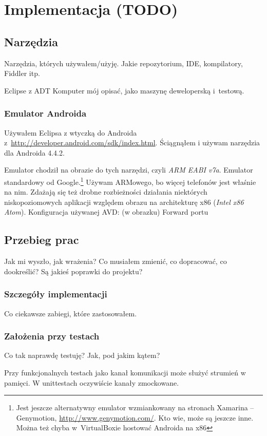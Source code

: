 \chapter{Implementacja (TODO)}

\section{Narzędzia}
Narzędzia, których używałem/użyję. Jakie repozytorium, IDE, kompilatory, Fiddler itp.

Eclipse z ADT
Komputer mój opisać, jako maszynę deweloperską i~testową.

\subsection{Emulator Androida}
\label{android-emulator}
Używałem Eclipsa z wtyczką do Androida z~\url{http://developer.android.com/sdk/index.html}.
Ściągnąłem i używam narzędzia dla Androida 4.4.2.

Emulator chodził na obrazie do tych narzędzi, czyli \emph{ARM EABI v7a}. Emulator standardowy od Google.\footnote{Jest jeszcze alternatywny emulator wzmiankowany na stronach Xamarina -- Genymotion, \url{http://www.genymotion.com/}. Kto wie, może są jeszcze inne. Można też chyba w~VirtualBoxie hostować Androida na x86}
Używam ARMowego, bo więcej telefonów jest właśnie na nim. Zdażają się też drobne rozbieżności działania niektórych niskopoziomowych aplikacji względem obrazu na architekturę x86 (\emph{Intel x86 Atom}).
Konfiguracja używanej AVD: (w obrazku)
Forward portu

\section{Przebieg prac}
Jak mi wyszło, jak wrażenia? Co musiałem zmienić, co dopracować, co dookreślić? Są jakieś poprawki do projektu?

\subsection{Szczegóły implementacji}
Co ciekawsze zabiegi, które zastosowałem.

\subsection{Założenia przy testach}
Co tak naprawdę testuję? Jak, pod jakim kątem?

Przy funkcjonalnych testach jako kanał komunikacji może służyć strumień w pamięci. W unittestach oczywiście kanały zmockowane.